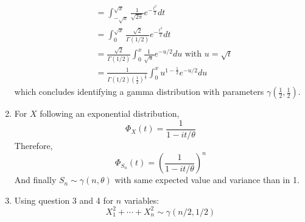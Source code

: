 \begin{solution}
\begin{enumerate}
\begin{align*}
                               & = \int_{-\sqrt{x}}^{\sqrt{x}} \frac{1}{\sqrt{2\pi}} e^{-\frac{t^2}{2}} dt                                    \\
                               & = \int_{0}^{\sqrt{x}} \frac{\sqrt{2}}{\Gamma(1/2)} e^{-\frac{t^2}{2}} dt                                     \\
                               & = \frac{\sqrt{2}}{\Gamma(1/2)} \int_0^{x} \frac{1}{\sqrt{u}} e^{-u/2} du \text{ with } u = \sqrt{t}          \\
                               & = \frac{1}{\Gamma(1/2) {\left( \frac{1}{2} \right)}^{\frac{1}{2}} } \int_0^{x} u^{1-\frac{1}{2}} e^{-u/2} du
          \end{align*}
          which concludes identifying a gamma distribution with parameters $\gamma(\frac{1}{2}, \frac{1}{2})$.
    \item For $X$ following an exponential distribution,
          \[
            \Phi_X(t) = \frac{1}{1 - it/\theta}
          \]
          Therefore,
          \[
            \Phi_{S_n}(t) = {\left( \frac{1}{1 - it/\theta} \right)}^n
          \]
          And finally $S_n \sim \gamma(n, \theta)$ with same expected value and variance
          than in 1.
    \item Using question 3 and 4 for $n$ variables:
          \[
            X_1^2 + \cdots + X_n^2 \sim \gamma(n/2, 1/2)
          \]

  \end{enumerate}
\end{solution}